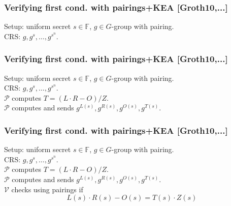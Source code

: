 \documentclass[shadesubsections,trans,14pt,mathserif]{beamer}
\newcommand{\F}{\ensuremath{\mathbb F}}
\newcommand{\ver}{\ensuremath{\mathcal{V}}}
\newcommand{\prv}{\ensuremath{\mathcal{P}}}
\begin{document}
 \begin{frame}
\frametitle{\normalsize{Verifying first cond. with pairings+KEA \normalsize{[Groth10,...]}} }  %
 Setup: uniform secret $s\in \F$, $g\in G$-group with pairing.\\
 \noindent
 CRS: $g,g^s,\ldots,g^{s^n}$.\\
 \vspace{0.2in}
\noindent 

\end{frame}
 \begin{frame}
\frametitle{\normalsize{Verifying first cond. with pairings+KEA \normalsize{[Groth10,...]}} }  %
 Setup: uniform secret $s\in \F$, $g\in G$-group with pairing.\\
 \noindent
 CRS: $g,g^s,\ldots,g^{s^n}$.\\
 \vspace{0.2in}
\noindent 
 $\prv$ computes $T=(L\cdot R - O)/Z$.\\
 \vspace{0.2in}
 \noindent
 $\prv$ computes and sends $g^{L(s)},g^{R(s)},g^{O(s)},g^{T(s)}$.\\
 \vspace{0.2in}
  \noindent

\end{frame}
 \begin{frame}
\frametitle{\normalsize{Verifying first cond. with pairings+KEA \normalsize{[Groth10,...]}} }  %
 Setup: uniform secret $s\in \F$, $g\in G$-group with pairing.\\
 \noindent
 CRS: $g,g^s,\ldots,g^{s^n}$.\\
 \vspace{0.2in}
\noindent 
 $\prv$ computes $T=(L\cdot R - O)/Z$.\\
 \vspace{0.2in}
 \noindent
 $\prv$ computes and sends $g^{L(s)},g^{R(s)},g^{O(s)},g^{T(s)}$.\\
 \vspace{0.2in}
  \noindent
$\ver$ checks using pairings if 
\[L(s)\cdot R(s) - O(s) = T(s)\cdot Z(s)\]

\end{frame}
\end{document}
